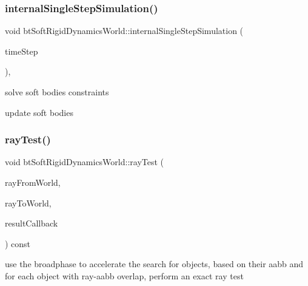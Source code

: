 \subsubsection{\texorpdfstring{internal\+Single\+Step\+Simulation()}{internalSingleStepSimulation()}}
{\footnotesize\ttfamily void bt\+Soft\+Rigid\+Dynamics\+World\+::internal\+Single\+Step\+Simulation (\begin{DoxyParamCaption}\item[{bt\+Scalar}]{time\+Step }\end{DoxyParamCaption})\hspace{0.3cm}{\ttfamily [protected]}, {\ttfamily [virtual]}}

solve soft bodies constraints

update soft bodies \mbox{\label{classbtSoftRigidDynamicsWorld_a74c164267415b885bba55a2bf319b337}} 
\subsubsection{\texorpdfstring{ray\+Test()}{rayTest()}}
{\footnotesize\ttfamily void bt\+Soft\+Rigid\+Dynamics\+World\+::ray\+Test (\begin{DoxyParamCaption}\item[{const bt\+Vector3 \&}]{ray\+From\+World,  }\item[{const bt\+Vector3 \&}]{ray\+To\+World,  }\item[{Ray\+Result\+Callback \&}]{result\+Callback }\end{DoxyParamCaption}) const\hspace{0.3cm}{\ttfamily [virtual]}}

use the broadphase to accelerate the search for objects, based on their aabb and for each object with ray-\/aabb overlap, perform an exact ray test \mbox{\label{classbtSoftRigidDynamicsWorld_a918218d4fe565ce42fd78c9d06d22cb0}} 
